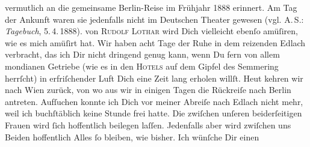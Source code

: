 \begin{ledgroupsized}[t]{13cm}
{{{                  vermutlich an die gemeinsame Berlin-Reise im
                  Frühjahr 1888 erinnert. Am Tag der Ankunft waren sie
                  jedenfalls nicht im Deutschen Theater gewesen
                     (vgl. A. S.: \emph{Tagebuch}, 5. 4. 1888).}}}\label{K_L03468-1h}
               von \textsc{Rudolf Lothar} wird Dich vielleicht ebenſo amüſiren, wie es mich amüſirt hat. \pend
           \pstart
           Wir haben acht Tage der Ruhe
               in dem reizenden Edlach verbracht, das ich Dir
               nicht dringend genug \label{K_L03468-2v}\label{K_L03468-2h} kann, wenn Du fern von allem
               mondianen Getriebe (wie es in den \textsc{Hotels} auf dem Gipfel des
                  Semmering herrſcht) in erfriſchender Luft {\pb}Dich eine Zeit lang erholen willſt. Heut kehren wir nach Wien zurück, von wo aus wir in einigen Tagen die Rückreiſe nach Berlin antreten.\pend
           \pstart
           Aufſuchen konnte ich Dich vor meiner Abreiſe nach Edlach nicht mehr, weil ich buchſtäblich keine Stunde frei hatte.\pend
           \pstart
           Die \label{K_L03468-4v}\label{K_L03468-4h} zwiſchen unſeren beiderſeitigen Frauen wird ſich
               hoffentlich beilegen laſſen. Jedenfalls aber wird zwiſchen uns Beiden hoffentlich
               Alles ſo bleiben, wie bisher.\pend
           \pstart
           Ich wünſche Dir einen \label{K_L03468-5v}
\end{ledgroupsized}
